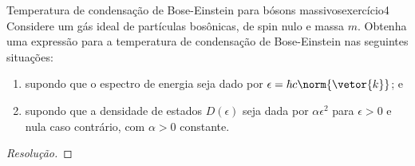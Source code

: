 \begin{exercício}{Temperatura de condensação de Bose-Einstein para bósons massivos}{exercício4}
    Considere um gás ideal de partículas bosônicas, de spin nulo e massa \(m\). Obtenha uma expressão para a temperatura de condensação de Bose-Einstein nas seguintes situações:
    \begin{enumerate}[label=(\alph*)]
        \item supondo que o espectro de energia seja dado por \(\epsilon = \hbar c \norm{\vetor{k}}\); e
        \item supondo que a densidade de estados \(D(\epsilon)\) seja dada por \(\alpha \epsilon^2\) para \(\epsilon > 0\) e nula caso contrário, com \(\alpha > 0\) constante.
    \end{enumerate}
\end{exercício}
\begin{proof}[Resolução]

\end{proof}
